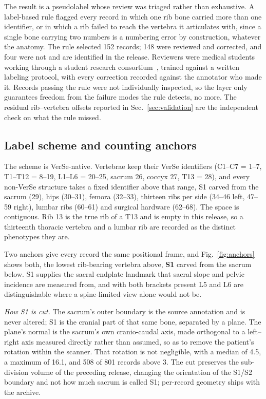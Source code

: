 \documentclass[aapm,mph,amsmath,amssymb,reprint]{revtex4-2}
\newif\ifreview \reviewtrue
\newcommand{\consortium}{\ifreview a student research consortium\else OpenSpineConsortium\fi}
\begin{document}
The result is a pseudolabel whose review was triaged rather than exhaustive. A label-based
rule flagged every record in which one rib
bone carried more than one identifier, or in which a rib failed to reach the vertebra it
articulates with, since a single bone carrying two numbers is a numbering error by construction,
whatever the anatomy. The rule selected 152 records; 148 were reviewed and corrected, and four
were not and are identified in the release. Reviewers were medical students working through
\consortium~\cite{osc2026}, trained against a written labeling protocol, with every
correction recorded against the annotator who made it. Records passing the rule were not
individually inspected, so the layer only guarantees freedom from the failure modes the rule detects, no more. The residual rib--vertebra offsets reported in
Sec.~\ref{sec:validation} are the independent check on what the rule missed.

\subsection{Label scheme and counting anchors}

The scheme is VerSe-native. Vertebrae keep their VerSe identifiers (C1--C7 = 1--7,
T1--T12 = 8--19, L1--L6 = 20--25, sacrum 26, coccyx 27, T13 = 28), and every non-VerSe
structure takes a fixed identifier above that range, S1 carved from the sacrum (29), hips (30--31), femora (32--33), thirteen ribs per side (34--46 left, 47--59 right), lumbar ribs (60--61) and surgical hardware (62--68). The space is contiguous. Rib 13 is the true rib of a T13 and is empty in this release, so a thirteenth thoracic vertebra and a lumbar rib are recorded as the distinct phenotypes they are.

Two anchors give every record the same positional frame, and Fig.~\ref{fig:anchors} shows both, the lowest rib-bearing vertebra above, \textbf{S1} carved from the sacrum below.  S1 supplies the sacral endplate
landmark that sacral slope and pelvic incidence are measured from, and with both brackets
present L5 and L6 are distinguishable where a spine-limited view alone would not be.

\emph{How S1 is cut.} The sacrum's outer boundary is the source annotation and is never
altered; S1 is the cranial part of that same bone, separated by a plane. The plane's normal
is the sacrum's own cranio-caudal axis, made orthogonal to a left--right axis
measured directly rather than assumed, so as to remove the patient's rotation within the scanner. That rotation is not negligible, with a median of 4.5\textdegree{}, a maximum of 16.1\textdegree{}, and 508 of 801 records above
3\textdegree{}. The cut preserves the sub-division volume of the preceding release,
changing the orientation of the S1/S2 boundary and not how much sacrum is called S1;
per-record geometry ships with the archive.
\end{document}
